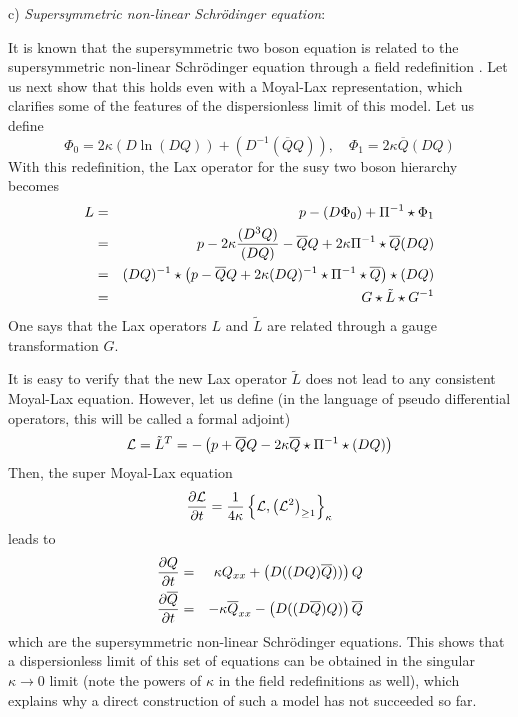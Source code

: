\documentclass[a4paper,11pt]{article}
\begin{document}
c) {\it Supersymmetric non-linear Schr\"{o}dinger equation}:
\medskip

It is known that the supersymmetric two boson equation is related to
the supersymmetric non-linear Schr\"{o}dinger equation through a field
redefinition \cite{5}. Let us next show that this holds even with a Moyal-Lax
representation, which clarifies some of the features of the
dispersionless limit of this model. Let us define
\begin{equation}
\Phi_{0} = 2\kappa (D \ln (DQ)) + (D^{-1}(\overline{Q}Q)),\quad
\Phi_{1} = 2\kappa \overline{Q} (DQ)
\end{equation}
With this redefinition, the Lax operator for the susy two boson
hierarchy becomes
\begin{eqnarray}
L & = & p - (D\Phi_{0}) + \Pi^{-1}\star \Phi_{1}\nonumber\\
 & = & p - 2\kappa {(D^{3}Q)\over (DQ)} - \overline{Q}Q + 2\kappa
 \Pi^{-1}\star \overline{Q} (DQ)\nonumber\\
 & = & (DQ)^{-1}\star \left(p - \overline{Q}Q + 2\kappa (DQ)^{-1}\star
 \Pi^{-1}\star \overline{Q}\right)\star (DQ)\nonumber\\
 & = & G\star \tilde{L}\star G^{-1}
\end{eqnarray}
One says that the Lax operators $L$ and $\tilde{L}$ are related through
a gauge transformation $G$.

It is easy to verify that the new Lax operator $\tilde{L}$ does not
lead to any consistent Moyal-Lax equation. However, let us define (in
the language of pseudo differential operators, this will be called a
formal adjoint)
\begin{equation}
{\cal L} = \tilde{L}^{T} = - \left(p + \overline{Q}Q - 2\kappa
\overline{Q}\star \Pi^{-1}\star (DQ)\right)\label{a}
\end{equation}
Then, the super Moyal-Lax equation
\begin{equation}
{\partial {\cal L}\over \partial t} = {1\over 4\kappa} \left\{{\cal
L}, \left({\cal L}^{2}\right)_{\geq 1}\right\}_{\kappa}
\end{equation}
leads to
\begin{eqnarray}
{\partial Q\over \partial t} & = &  \kappa Q_{xx} + 
\left(D((DQ)\overline{Q}))\right) Q\nonumber\\
{\partial \overline{Q}\over \partial t} & = & - \kappa\overline{Q}_{xx} -
\left(D((D\overline{Q}) Q)\right) \overline{Q}
\end{eqnarray}
which are the supersymmetric non-linear Schr\"{o}dinger
equations. This shows that a dispersionless limit of this set of
equations can be obtained in the singular $\kappa\rightarrow 0$ limit
(note the powers of $\kappa$ in the field redefinitions as well),
which explains why a direct construction of such a model has not
succeeded so far.
\end{document}
